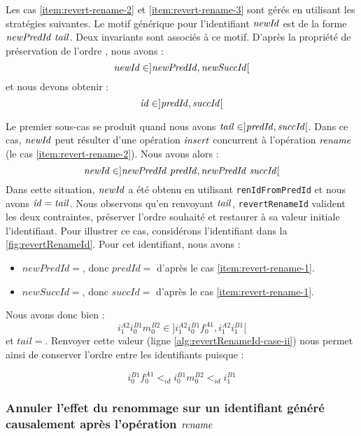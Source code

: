 Les cas \ref{item:revert-rename-2} et \ref{item:revert-rename-3} sont gérés en utilisant les stratégies suivantes.
Le motif générique pour l'identifiant $\mathit{newId}$ est de la forme $\mathit{newPredId~tail}$.
Deux invariants sont associés à ce motif.
D'après la propriété de préservation de l'ordre , nous avons :
\[\mathit{newId} \in ]\mathit{newPredId}, \mathit{newSuccId}[\]
et nous devons obtenir :
\[\mathit{id} \in ]\mathit{predId}, \mathit{succId}[\]

Le premier sous-cas se produit quand nous avons $\mathit{tail} \in ]\mathit{predId}, \mathit{succId}[$.
Dans ce cas, $\mathit{newId}$ peut résulter d'une opération $\mathit{insert}$ concurrent à l'opération $\mathit{rename}$ (\ie le cas \ref{item:revert-rename-2}).
Nous avons alors :
\[\mathit{newId} \in ]\mathit{newPredId~predId}, \mathit{newPredId~succId}[\]
Dans cette situation, $\mathit{newId}$ a été obtenu en utilisant \texttt{renIdFromPredId} et nous avons $\mathit{id} = \mathit{tail}$.
Nous observons qu'en renvoyant $\mathit{tail}$, \texttt{revertRenameId} valident les deux contraintes, \ie préserver l'ordre souhaité et restaurer à sa valeur initiale l'identifiant.
Pour illustrer ce cas, considérons l'identifiant  dans la \autoref{fig:revertRenameId}.
Pour cet identifiant, nous avons :
\begin{itemize}
  \item $newPredId = $, donc $predId = $ d'après le cas \ref{item:revert-rename-1}.
  \item $newSuccId = $, donc $succId = $ d'après le cas \ref{item:revert-rename-1}.
\end{itemize}
Nous avons donc bien :
\[i^{A2}_{1}i^{B1}_{0}m^{B2}_{0} \in ]i^{A2}_{1}i^{B1}_{0}f^{A1}_{0}, i^{A2}_{1}i^{B1}_{1}[\]
et $tail = $.
Renvoyer cette valeur (ligne \ref{alg:revertRenameId-case-ii}) nous permet ainsi de conserver l'ordre entre les identifiants puisque :

\[i^{B1}_{0}f^{A1}_{0} <_{id} i^{B1}_{0}m^{B2}_{0} <_{id} i^{B1}_{1}\]

\subsubsection{Annuler l'effet du renommage sur un identifiant généré causalement après l'opération $\mathit{rename}$}

